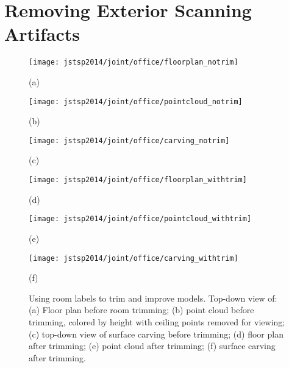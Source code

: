 \documentclass[12pt,onecolumn,oneside]{book}
\begin{document}
\section{Removing Exterior Scanning Artifacts}
\label{sec:explosion_removal}

\begin{figure}[t]

	\centering

	\begin{minipage}[t]{0.3\linewidth} %
		\centerline{\texttt{[image: jstsp2014/joint/office/floorplan\_notrim]}}
		\centerline{(a)}\medskip
	\end{minipage}
	\hfill
	\begin{minipage}[t]{0.3\linewidth} %
		\centerline{\texttt{[image: jstsp2014/joint/office/pointcloud\_notrim]}}
		\centerline{(b)}\medskip
	\end{minipage}
	\hfill
	\begin{minipage}[t]{0.3\linewidth} %
		\centerline{\texttt{[image: jstsp2014/joint/office/carving\_notrim]}}
		\centerline{(c)}\medskip
	\end{minipage}

	\begin{minipage}[t]{0.3\linewidth} %
		\centerline{\texttt{[image: jstsp2014/joint/office/floorplan\_withtrim]}}
		\centerline{(d)}\medskip
	\end{minipage}
	\hfill
	\begin{minipage}[t]{0.3\linewidth} %
		\centerline{\texttt{[image: jstsp2014/joint/office/pointcloud\_withtrim]}}
		\centerline{(e)}\medskip
	\end{minipage}
	\hfill
	\begin{minipage}[t]{0.3\linewidth} %
		\centerline{\texttt{[image: jstsp2014/joint/office/carving\_withtrim]}}
		\centerline{(f)}\medskip
	\end{minipage}
	
	\caption[Using room labels to trim and improve models.]{Using room labels to trim and improve models.  Top-down view of: (a) Floor plan before room trimming; (b) point cloud before trimming, colored by height with ceiling points removed for viewing; (c) top-down view of surface carving before trimming; (d) floor plan after trimming; (e) point cloud after trimming; (f) surface carving after trimming.}
	\label{fig:explosion_trimming}

\end{figure}
\end{document}
